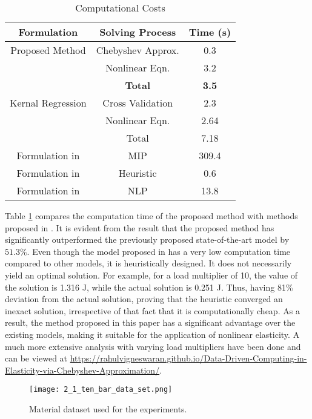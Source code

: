 \documentclass[conference]{IEEEtran}
\begin{document}
\begin{table}[]
\centering
\caption{Computational Costs}
\begin{tabular}{|c|c|c|}
\hline
\textbf{Formulation} & \textbf{Solving Process} & \textbf{Time (s)} \\ \hline
Proposed Method & Chebyshev Approx. & 0.3 \\ \hline
 & Nonlinear Eqn. & 3.2 \\ \hline
 & \textbf{Total} & \textbf{3.5} \\ \hline
Kernal Regression \cite{26} & Cross Validation & 2.3 \\ \hline
 & Nonlinear Eqn. & 2.64 \\ \hline
 & Total & 7.18 \\ \hline
Formulation in  \cite{14} & MIP \cite{24} & 309.4 \\ \hline
Formulation in \cite{14} & Heuristic \cite{14} & 0.6 \\ \hline
Formulation in \cite{15} & NLP & 13.8 \\ \hline
\end{tabular}

\label{tab1}
\end{table}

Table \ref{tab1} compares the computation time of the proposed method with methods proposed in \cite{14,15,24,16}. It is evident from the result that the proposed method has significantly outperformed the previously proposed state-of-the-art model by $51.3\%$. Even though the model proposed in \cite{14} has a very low computation time compared to other models, it is heuristically designed. It does not necessarily yield an optimal solution. For example, for a load multiplier of 10, the value of the solution is 1.316 J, while the actual solution is 0.251 J. Thus, having 81\% deviation from the actual solution, proving that the heuristic converged an inexact solution, irrespective of that fact that it is computationally cheap. As a result, the method proposed in this paper has a significant advantage over the existing models, making it suitable for the application of nonlinear elasticity. A much more extensive analysis with varying load multipliers have been done and can be viewed at \href{https://rahulvigneswaran.github.io/Data-Driven-Computing-in-Elasticity-via-Chebyshev-Approximation/}{https://rahulvigneswaran.github.io/Data-Driven-Computing-in-Elasticity-via-Chebyshev-Approximation/}. 

\begin{figure}[htbp]
\centerline{\texttt{[image: 2\_1\_ten\_bar\_data\_set.png]}}
\caption{Material dataset used for the experiments.}
\label{fig4}
\end{figure}
\end{document}
